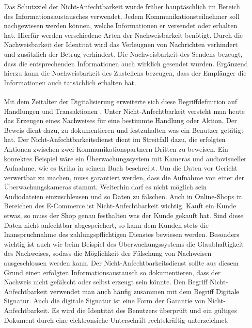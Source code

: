 \documentclass[utf8,biblatex]{lni}
\begin{document}
Das Schutzziel der Nicht-Anfechtbarkeit wurde früher hauptäschlich im Bereich des Informationsaustausches verwendet. Jedem Kommunikationsteilnehmer soll nachgewiesen werden können, welche Informationen er 
versendet oder erhalten hat. Hierfür werden verschiedene Arten der Nachweisbarkeit benötigt. Durch die Nachweisbarkeit der Identität wird das Verleugnen von Nachrichten verhindert und zusätzlich der Betrug verhindert.
Die Nachweisbarkeit des Sendens bezeugt, dass die entsprechenden Informationen auch wirklich gesendet wurden. Ergänzend hierzu kann die Nachweisbarkeit des Zustellens bezeugen, dass der Empfänger die Informationen
auch tatsächlich erhalten hat. \citet{Bedner.2010}
\\\\
Mit dem Zeitalter der Digitalisierung erweiterte sich diese Begriffdefinition auf Handlungen und Transaktionen \citet{Bedner.2010}.
Unter Nicht-Anfechtbarkeit versteht man heute das Erzeugen eines Nachweises für eine bestimmte Handlung oder Aktion. Der Beweis dient dazu, zu dokumentieren und festzuhalten was ein Benutzer getätigt hat. 
Der Nicht-Anfechtbarkeitsdienst
dient im Streitfall dazu, die erfolgten Aktionen zwischen zwei Kommunikationspartnern Dritten zu beweisen.
Ein konrektes Beispiel wäre ein Überwachungssystem mit Kameras und audiovisueller Aufnahme, wie es Kriha in seinem Buch \citet{Kriha.2008} beschreibt. Um die Daten vor Gericht verwertbar zu machen, muss garantiert werden, dass die Aufnahme von einer der Überwachungskameras stammt.
Weiterhin darf es nicht möglich sein Audiodateien einzuschleusen und so Daten zu fälschen. Auch in Online-Shops in Bereichen des E-Commerce ist Nicht-Anfechtbarkeit wichtig.
Kauft ein Kunde etwas, so muss der Shop genau festhalten was der Kunde gekauft hat. Sind diese Daten nicht-anfechtbar abgespeichert, so kann dem Kunden stets die Inanspruchnahme des zahlungspflichtigen Dienstes
bewiesen werden. Besonders wichtig ist auch wie beim Beispiel des Überwachungssystems die Glaubhaftigkeit des Nachweises, sodass die Möglichkeit der Fälschung von Nachweisen ausgeschlossen werden kann.
Der Nicht-Anfechtbarkeitsdienst sollte aus diesem Grund einen erfolgten Informationsaustausch so dokumentieren, dass der Nachweis nicht gefälscht oder selbst erzeugt sein könnte. 
Den Begriff Nicht-Anfechtbarkeit verwendet man auch häufig zusammen mit dem Begriff \glqq Digitale Signatur\grqq{}. Auch die digitale Signatur ist eine Form der Garantie von Nicht-Anfechtbarkeit. 
Es wird die Identität des Benutzers überprüft und ein gültiges Dokument durch eine elektronsiche Unterschrift rechtskräftig unterzeichnet.\citet{Bedner.2010} \citet{Kriha.2008}
\end{document}
